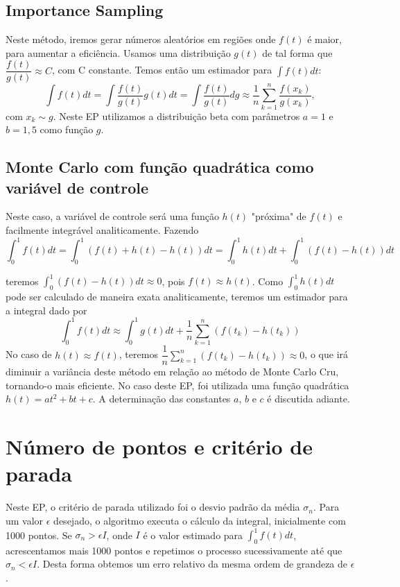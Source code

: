 \documentclass[a4paper]{article}
\begin{document}
\subsection{Importance Sampling}

Neste método, iremos gerar números aleatórios em regiões onde $f(t)$ é maior, para aumentar a eficiência. Usamos uma distribuição $g(t)$ de tal forma que $\dfrac{f(t)}{g(t)}\approx C$, com C constante. Temos então um estimador para $\int f(t)dt$:
\[\int f(t)dt=\int \dfrac{f(t)}{g(t)}g(t)dt=\int \dfrac{f(t)}{g(t)}dg\approx\dfrac{1}{n}\sum_{k=1}^{n}\dfrac{f(x_k)}{g(x_k)},\]
com $x_k\sim g$. Neste EP utilizamos a distribuição beta com parâmetros $a=1$ e $b=1,5$ como função $g$.


\subsection{Monte Carlo com função quadrática como variável de controle}

Neste caso, a variável de controle será uma função $h(t)$ "próxima" de $f(t)$ e facilmente integrável analiticamente. Fazendo
\[\int_0^1f(t)dt=\int_0^1(f(t)+h(t)-h(t))dt=\int_0^1h(t)dt+\int_0^1(f(t)-h(t))dt\]

teremos $\int_0^1(f(t)-h(t))dt\approx 0$, pois $f(t)\approx h(t)$. Como $\int_0^1h(t)dt$ pode ser calculado de maneira exata analiticamente, teremos um estimador para a integral dado por
\[\int_0^1f(t)dt\approx \int_0^1g(t)dt+\dfrac{1}{n}\sum_{k=1}^n(f(t_k)-h(t_k))\]
No caso de $h(t)\approx f(t)$, teremos $\dfrac{1}{n}\sum_{k=1}^n(f(t_k)-h(t_k))\approx 0$, o que irá diminuir a variância deste método em relação ao método de Monte Carlo Cru, tornando-o mais eficiente. No caso deste EP, foi utilizada uma função quadrática $h(t)=at^2+bt+c$. A determinação das constantes $a$, $b$ e $c$ é discutida adiante. 

\section{Número de pontos e critério de parada}

	Neste EP, o critério de parada utilizado foi o desvio padrão da média $\sigma_n$. Para um valor $\epsilon$ desejado, o algoritmo executa o cálculo da integral, inicialmente com 1000 pontos. Se $\sigma_n>\epsilon I$, onde $I$ é o valor estimado para $\int_0^1f(t)dt$, acrescentamos mais 1000 pontos e repetimos o processo sucessivamente até que $\sigma_n<\epsilon I$. Desta forma obtemos um erro relativo da mesma ordem de grandeza de $\epsilon$.
\end{document}
